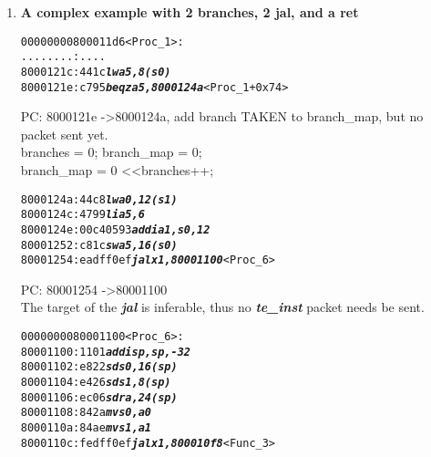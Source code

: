 \begin{enumerate}
\item

   \textbf{A complex example with 2 branches, 2 jal, and a ret}

  \begin {alltt}
00000000800011d6 <Proc\_1>:
    ........:   ....
    8000121c:	441c                	\textbf{\textit{lw	a5,8(s0)}}
    8000121e:	c795                	\textbf{\textit{beqz	a5,8000124a}} <Proc\_1+0x74>
  \end{alltt}
  
  \begin{frame}

  PC: 8000121e -\textgreater 8000124a, add branch TAKEN to branch\_map, but no packet sent yet.\\
  branches = 0; branch\_map = 0;\\
  branch\_map \textbar= 0 \textless\textless branches++;
  \end{frame}
  
\begin{alltt}
    
    8000124a:	44c8                	\textbf{\textit{lw	a0,12(s1)}}
    8000124c:	4799                	\textbf{\textit{li	a5,6}}
    8000124e:	00c40593          	\textbf{\textit{addi	a1,s0,12}}
    80001252:	c81c                	\textbf{\textit{sw	a5,16(s0)}}
    80001254:	eadff0ef          	\textbf{\textit{jal	x1,80001100}} <Proc\_6>
\end{alltt}

  \begin{frame}

  PC: 80001254 -\textgreater 80001100\\
  The target of the \textbf{\textit{jal}} is inferable, thus no \textbf{\textit{te\_inst}} packet needs be sent.\\
  \end{frame}
  

\begin{alltt}
  
    0000000080001100 <Proc\_6>:
    80001100:	1101                    \textbf{\textit{addi	sp,sp,-32}}
    80001102:	e822                    \textbf{\textit{sd	s0,16(sp)}}
    80001104:	e426                    \textbf{\textit{sd	s1,8(sp)}}
    80001106:	ec06                    \textbf{\textit{sd	ra,24(sp)}}
    80001108:	842a                    \textbf{\textit{mv	s0,a0}}
    8000110a:	84ae                    \textbf{\textit{mv	s1,a1}}
    8000110c:	fedff0ef                \textbf{\textit{jal	x1,800010f8}} <Func\_3>
\end{alltt}


\end{enumerate}
